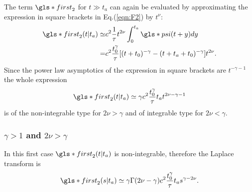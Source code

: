 The term $\gls*{first}_2$ for $t \gg t_a$ can again be 
evaluated by approximating the expression in square brackets in Eq.(\ref{eqn:F2}) by $t^\nu$: 
\begin{align}
 \gls*{first}_2(t|t_a) \simeq & c^2  \frac{1}{\tau} t^{2\nu} \int_0^{t_a} \gls*{psi}(t+y)dy \\
 =& c^2 \frac{ t_0^\gamma }{\tau} [(t+t_0)^{-\gamma}-(t+t_a+t_0)^{-\gamma}]t^{2\nu}. 
\label{F2lagrer1}
\end{align}
Since the power law asymptotics of the expression in square brackets are $t^{-\gamma -1}$ the whole expression
\begin{equation}
 \gls*{first}_2(t|t_a) \simeq \gamma c^2  \frac{t_0^\gamma }{\tau}t_a t^{2\nu-\gamma -1}
\end{equation}
is of the non-integrable type for $2\nu > \gamma$ and of integrable type for $2 \nu < \gamma$.

\subsubsection{$\gamma>1$ and $2\nu > \gamma$} 
In this first case $\gls*{first}_2(t|t_a)$ is non-integrable, therefore the Laplace transform is 
\begin{equation}
 \gls*{first}_2(s|t_a) \simeq \gamma\Gamma (2\nu-\gamma) c^2\frac{t_0^\gamma}{\tau}t_a s^{\gamma - 2\nu}.
\end{equation}

